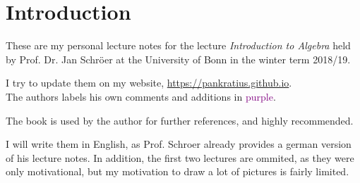 \chapter*{Introduction}
These are my personal lecture notes for the lecture \textit{Introduction to Algebra} held by Prof. Dr. Jan Schröer at the University of Bonn in the winter term 2018/19.\par
I try to update them on my website, \url{https://pankratius.github.io}.\\
The authors labels his own comments and additions in \textcolor{purple}{purple}.\par
The book \cite{aluffi} is used by the author for further references, and highly recommended.


I will write them in English, as Prof. Schroer already provides a german version of his lecture notes. In addition, the first two lectures are ommited, as they were only motivational, but my motivation to draw a lot of pictures is fairly limited.
